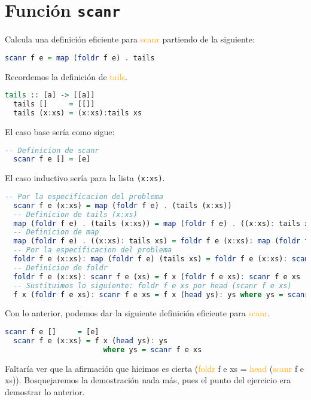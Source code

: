 \documentclass[spanish,12pt,letterpaper]{article}
\begin{document}
\section{Función \texttt{scanr}}
Calcula una definición eficiente para \textcolor{orange}{scanr} partiendo de la
siguiente:

\begin{lstlisting}[language=Haskell]
  scanr f e = map (foldr f e) . tails
\end{lstlisting}

Recordemos la definición de \textcolor{orange}{tails}.

\begin{lstlisting}[language=Haskell]
  tails :: [a] -> [[a]]
  tails []     = [[]]
  tails (x:xs) = (x:xs):tails xs
\end{lstlisting}

El caso base sería como sigue:

\begin{lstlisting}[language=Haskell]
  -- Definicion de scanr
  scanr f e [] = [e]
\end{lstlisting}

El caso inductivo sería para la lista \texttt{(x:xs)}.

\begin{lstlisting}[language=Haskell]
  -- Por la especificacion del problema
  scanr f e (x:xs) = map (foldr f e) . (tails (x:xs))
  -- Definicion de tails (x:xs)
  map (foldr f e) . (tails (x:xs)) = map (foldr f e) . ((x:xs): tails xs)
  -- Definicion de map
  map (foldr f e) . ((x:xs): tails xs) = foldr f e (x:xs): map (foldr f e) (tails xs)
  -- Por la especificacion del problema
  foldr f e (x:xs): map (foldr f e) (tails xs) = foldr f e (x:xs): scanr f e (xs)
  -- Definicion de foldr
  foldr f e (x:xs): scanr f e (xs) = f x (foldr f e xs): scanr f e xs
  -- Sustituimos lo siguiente: foldr f e xs por head (scanr f e xs)
  f x (foldr f e xs): scanr f e xs = f x (head ys): ys where ys = scanr f e xs
\end{lstlisting}

Con lo anterior, podemos dar la siguiente definición eficiente para
\textcolor{orange}{scanr}.

\begin{lstlisting}[language=Haskell]
  scanr f e []     = [e]
  scanr f e (x:xs) = f x (head ys): ys
                       where ys = scanr f e xs
\end{lstlisting}

Faltaría ver que la afirmación que hicimos es cierta
(\textcolor{orange}{foldr} f e xs =  \textcolor{orange}{head}
(\textcolor{orange}{scanr} f e xs)). Bosquejaremos la demostración nada más, pues
el punto del ejercicio era demostrar lo anterior.
\end{document}
